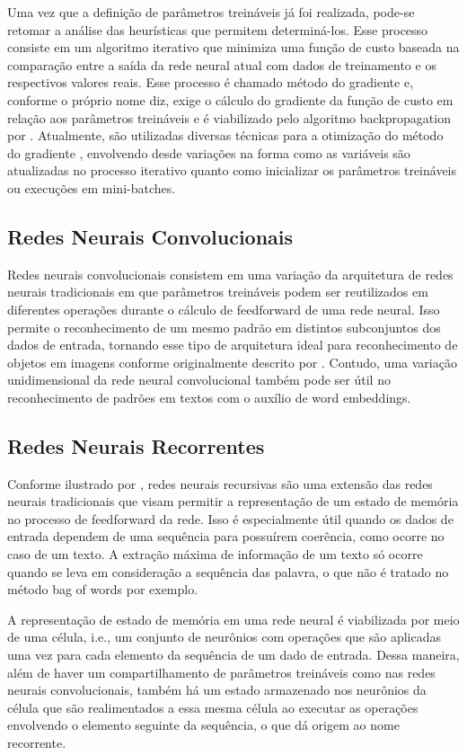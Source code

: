Uma vez que a definição de parâmetros treináveis já foi realizada, pode-se retomar a análise das heurísticas que permitem determiná-los. Esse processo consiste em um algoritmo iterativo que minimiza uma função de custo baseada na comparação entre a saída da rede neural atual com dados de treinamento e os respectivos valores reais. Esse processo é chamado método do gradiente e, conforme o próprio nome diz, exige o cálculo do gradiente da função de custo em relação aos parâmetros treináveis e é viabilizado pelo algoritmo backpropagation por \cite{Rumelhart1986}. Atualmente, são utilizadas diversas técnicas para a otimização do método do gradiente \cite{DBLP:journals/corr/Ruder16}, envolvendo desde variações na forma como as variáveis são atualizadas no processo iterativo quanto como inicializar os parâmetros treináveis ou execuções em mini-batches.

\subsection{Redes Neurais Convolucionais}
Redes neurais convolucionais consistem em uma variação da arquitetura de redes neurais tradicionais em que parâmetros treináveis podem ser reutilizados em diferentes operações durante o cálculo de feedforward de uma rede neural. Isso permite o reconhecimento de um mesmo padrão em distintos subconjuntos dos dados de entrada, tornando esse tipo de arquitetura ideal para reconhecimento de objetos em imagens conforme originalmente descrito por \cite{LeCun1999}. Contudo, uma variação unidimensional da rede neural convolucional também pode ser útil no reconhecimento de padrões em textos com o auxílio de word embeddings.

\subsection{Redes Neurais Recorrentes}

Conforme ilustrado por \cite{ColahLSTM}, redes neurais recursivas são uma extensão das redes neurais tradicionais que visam permitir a representação de um estado de memória no processo de feedforward da rede. Isso é especialmente útil quando os dados de entrada dependem de uma sequência para possuírem coerência, como ocorre no caso de um texto. A extração máxima de informação de um texto só ocorre quando se leva em consideração a sequência das palavra, o que não é tratado no método bag of words por exemplo.

A representação de estado de memória em uma rede neural é viabilizada por meio de uma célula, i.e., um conjunto de neurônios com operações que são aplicadas uma vez para cada elemento da sequência de um dado de entrada. Dessa maneira, além de haver um compartilhamento de parâmetros treináveis como nas redes neurais convolucionais, também há um estado armazenado nos neurônios da célula que são realimentados a essa mesma célula ao executar as operações envolvendo o elemento seguinte da sequência, o que dá origem ao nome recorrente.
